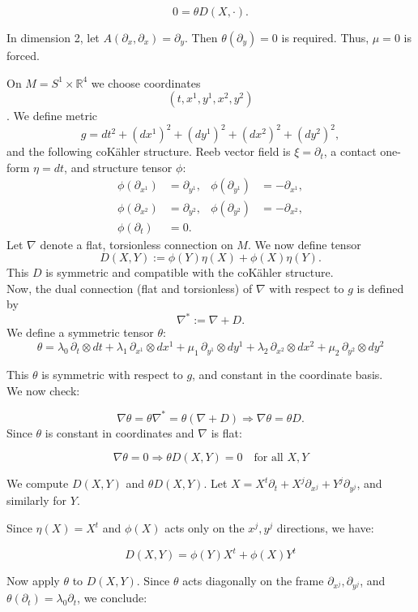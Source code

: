 $$
0 = \theta D(X, \cdot).
$$
\begin{ex}
In dimension 2, let $A(\partial_x, \partial_x) = \partial_y$. Then $\theta(\partial_y) = 0$ is required. Thus, $\mu = 0$ is forced.
\end{ex}
\begin{ex}
On $M = S^1 \times \mathbb{R}^4$ we choose coordinates 
$$
(t, x^1, y^1, x^2, y^2)
$$.
We define metric
$$
g = dt^2 + (dx^1)^2 + (dy^1)^2 + (dx^2)^2 + (dy^2)^2,
$$
and the following coK\"{a}hler structure. Reeb vector field is $\xi = \partial_t$, a contact one-form $\eta = dt$, and structure tensor $\phi$:
$$
  \begin{aligned}
  \phi(\partial_{x^1}) &= \partial_{y^1}, & \phi(\partial_{y^1}) &= -\partial_{x^1}, \\
  \phi(\partial_{x^2}) &= \partial_{y^2}, & \phi(\partial_{y^2}) &= -\partial_{x^2}, \\
  \phi(\partial_t) &= 0.
  \end{aligned}
  $$
Let $\nabla$ denote a flat, torsionless connection on $M$. We now define tensor
$$
D(X, Y) := \phi(Y) \eta(X) + \phi(X) \eta(Y).
$$
This $D$ is symmetric and compatible with the coKähler structure.\\
Now, the dual connection (flat and torsionless) of $\nabla$ with respect to $g$ is defined by 
$$\nabla^*:=\nabla + D.$$
We define a symmetric tensor $\theta$:
$$
\theta = \lambda_0 \, \partial_t \otimes dt
+ \lambda_1 \, \partial_{x^1} \otimes dx^1
+ \mu_1 \, \partial_{y^1} \otimes dy^1
+ \lambda_2 \, \partial_{x^2} \otimes dx^2
+ \mu_2 \, \partial_{y^2} \otimes dy^2
$$

This $\theta$ is symmetric with respect to $g$, and constant in the coordinate basis.\\
We now check:

$$
\nabla \theta = \theta \nabla^* = \theta(\nabla + D)
\Rightarrow \nabla \theta = \theta D.
$$
Since $\theta$ is constant in coordinates and $\nabla$ is flat:

$$
\nabla \theta = 0
\Rightarrow \theta D(X, Y) = 0
\quad \text{for all } X, Y
$$

We compute $D(X, Y)$ and $\theta D(X, Y).$ Let $X = X^t \partial_t + X^j \partial_{x^j} + Y^j \partial_{y^j}$, and similarly for $Y$.

Since $\eta(X) = X^t$ and $\phi(X)$ acts only on the $x^j, y^j$ directions, we have:

$$
D(X, Y) = \phi(Y) X^t + \phi(X) Y^t
$$


Now apply $\theta$ to $D(X, Y)$. Since $\theta$ acts diagonally on the frame $\partial_{x^j}, \partial_{y^j}$, and $\theta(\partial_t) = \lambda_0 \partial_t$, we conclude:


\end{ex}
